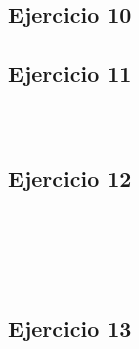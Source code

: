 \documentclass[10pt,a4paper]{article}
\begin{document}
\subsection{Ejercicio 10}
\subsection{Ejercicio 11}
\subsubsection{}
    \begin{lstlisting}
    \end{lstlisting}
\subsubsection{}
    \begin{lstlisting}
    \end{lstlisting}
\subsection{Ejercicio 12}
\subsubsection{}
    \begin{lstlisting}
    \end{lstlisting}
\subsubsection{}
    \begin{lstlisting}
    \end{lstlisting}
\subsubsection{}
    \begin{lstlisting}
    \end{lstlisting}
\subsubsection{}
    \begin{lstlisting}
    \end{lstlisting}
\subsection{Ejercicio 13}
\subsubsection{}
    \begin{lstlisting}
    \end{lstlisting}
\end{document}
